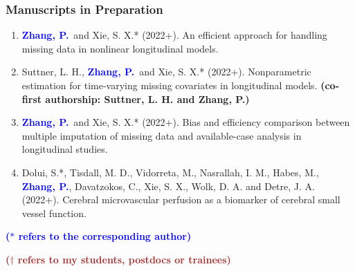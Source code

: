 \documentclass{res}
\newcommand{\PZnot}{\textbf{\textcolor{blue}{Zhang, P.}}}
\begin{document}
\begin{resume}
\subsubsection{Manuscripts in Preparation}
\begin{enumerate}
	\item \PZnot\ and {\sc Xie, S. X.*} (2022+). An efficient 
	approach for handling missing data in nonlinear longitudinal
	models.	
	\item {\sc Suttner, L. H.,} \PZnot\ and {\sc Xie, S. X.*} 
	(2022+). Nonparametric estimation for time-varying missing 
	covariates in longitudinal models.  {\bf \small (co-first 
	authorship: Suttner, 
	L. H. and Zhang, P.)}
	\item \PZnot\ and {\sc Xie, S. X.*} (2022+). Bias 
	and efficiency comparison between multiple imputation of missing 
	data and available-case analysis in longitudinal studies. 
	\item {\sc Dolui, S.*, Tisdall, M. D., Vidorreta, M., 
	Nasrallah, I. M., Habes, M.}, \PZnot, {\sc 
	Davatzokos, C., Xie, S. X., Wolk, D. A.} and {\sc Detre, J. A.} 
	(2022+). Cerebral microvascular perfusion as a biomarker of 
	cerebral small vessel function.
\end{enumerate}

{\bf \textcolor{blue}{($\ast$ refers to the corresponding author)}}

{\bf \textcolor{brown}{($\dagger$ refers to my students, postdocs 
or trainees)}}


\end{resume}
\end{document}
